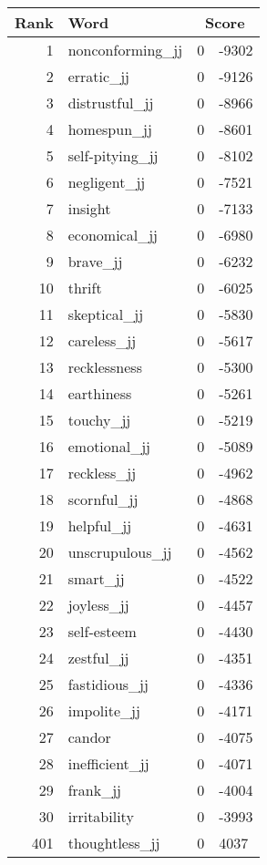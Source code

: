 \begin{longtable}[!htbp]{| rlr@{.}l |}
    \hline
    \textbf{Rank} & \textbf{Word} & \multicolumn{2}{c|}{\textbf{Score}} \\
    \hline
    \endhead
    1 & nonconforming\_jj & 0 & -9302 \\
    2 & erratic\_jj & 0 & -9126 \\
    3 & distrustful\_jj & 0 & -8966 \\
    4 & homespun\_jj & 0 & -8601 \\
    5 & self-pitying\_jj & 0 & -8102 \\
    6 & negligent\_jj & 0 & -7521 \\
    7 & insight & 0 & -7133 \\
    8 & economical\_jj & 0 & -6980 \\
    9 & brave\_jj & 0 & -6232 \\
    10 & thrift & 0 & -6025 \\
    11 & skeptical\_jj & 0 & -5830 \\
    12 & careless\_jj & 0 & -5617 \\
    13 & recklessness & 0 & -5300 \\
    14 & earthiness & 0 & -5261 \\
    15 & touchy\_jj & 0 & -5219 \\
    16 & emotional\_jj & 0 & -5089 \\
    17 & reckless\_jj & 0 & -4962 \\
    18 & scornful\_jj & 0 & -4868 \\
    19 & helpful\_jj & 0 & -4631 \\
    20 & unscrupulous\_jj & 0 & -4562 \\
    21 & smart\_jj & 0 & -4522 \\
    22 & joyless\_jj & 0 & -4457 \\
    23 & self-esteem & 0 & -4430 \\
    24 & zestful\_jj & 0 & -4351 \\
    25 & fastidious\_jj & 0 & -4336 \\
    26 & impolite\_jj & 0 & -4171 \\
    27 & candor & 0 & -4075 \\
    28 & inefficient\_jj & 0 & -4071 \\
    29 & frank\_jj & 0 & -4004 \\
    30 & irritability & 0 & -3993 \\
    401 & thoughtless\_jj & 0 & 4037 \\

\end{longtable}
